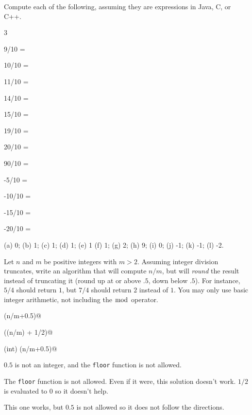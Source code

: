 \begin{exer}
Compute each of the following, assuming they are expressions 
in Java, C, or C++.

\vspace*{-.25in}
\begin{multicols}{3}
\begin{lenum}
\item 9/10 = 
\item 10/10 = 
\item 11/10 = 
\item 14/10 = 
\item 15/10 = 
\item 19/10 = 
\item 20/10 = 
\item 90/10 = 
\item -5/10 = 
\item -10/10 = 
\item -15/10 = 
\item -20/10 = 
\end{lenum}
\end{multicols}
\begin{answer}
(a) 0; (b) 1; (c) 1; (d) 1; (e) 1 (f) 1; (g) 2; (h) 9; (i) 0; (j) -1; (k) -1; (l) -2.
\end{answer}
\end{exer}

\newpage

\begin{eval}\label{exer:roundNotTruncate}
Let $n$ and $m$ be positive integers with $m>2$.  
Assuming integer division truncates, write an algorithm that will compute $n/m$,  
but will {\em round} the result instead of truncating it (round up at or above $.5$, down below $.5$).  
For instance, $5/4$ should return $1$, but 
$7/4$ should return $2$ instead of $1$.
You may only use basic integer arithmetic, not including the $\bmod$ operator.
\begin{ssolenum}
\item
\verb@floor(n/m+0.5)@\\
\evallinetwo
\item
\verb@floor((n/m) + 1/2)@\\
\evallinetwo
\item
\verb@(int) (n/m+0.5)@\\
\evallinetwo
\end{ssolenum}
\begin{answer}
\begin{solevalenum}
\item
$0.5$ is not an integer, and the \verb+floor+ function is not allowed.
\item
The \verb+floor+ function is not allowed.  Even if it were, this solution 
doesn't work. $1/2$ is evaluated to $0$ so it doesn't help.
\item
This one works, but $0.5$ is not allowed so it does not follow the directions.
\end{solevalenum}
\end{answer}
\end{eval}


